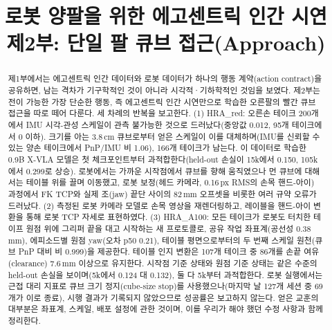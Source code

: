 \documentclass[conference,10pt]{IEEEtran}
\newcommand{\mm}{\,mm\xspace}
\begin{document}
\title{로봇 양팔을 위한 에고센트릭 인간 시연\\제2부: 단일 팔 큐브 접근(Approach)}
\author{
}
\maketitle

\begin{abstract}
제1부에서는 에고센트릭 인간 데이터와 로봇 데이터가 하나의 행동 계약(action contract)을 공유하면, 남는 격차가 기구학적인
것이 아니라 시각적·기하학적인 것임을 보였다. 제2부는 전이 가능한 가장 단순한 행동, 즉 에고센트릭 인간 시연만으로 학습한
오른팔의 빨간 큐브 접근을 따로 떼어 다룬다. 세 차례의 반복을 보고한다. (1) HRA\_red: 오른손 테이크 200개에서 IMU
시각-관성 스케일이 관측 불가능한 것으로 드러났다(중앙값 0.012, 95개 테이크에서 0 이하). 크기를 아는 3.8\,cm 큐브로부터
얻은 스케일이 이를 대체하며(IMU를 신뢰할 수 있는 양손 테이크에서 PnP/IMU 비 1.06), 166개 테이크가 남는다. 이 데이터로
학습한 0.9B X-VLA 모델은 첫 체크포인트부터 과적합한다(held-out 손실이 15k에서 0.150, 105k에서 0.299로 상승). 로봇에서는
가까운 시작점에서 큐브를 향해 움직였으나 먼 큐브에 대해서는 테이블 위를 끌며 이동했고, 로봇 보정(헤드 카메라, 0.16\,px
RMS의 손목 핸드-아이) 과정에서 FK TCP와 실제 조(jaw) 끝단 사이의 82\mm 오프셋을 비롯한 여러 규약 오류가 드러났다.
(2) 측정된 로봇 카메라 모델로 손목 영상을 재렌더링하고, 레이블을 핸드-아이 변환을 통해 로봇 TCP 자세로 표현하였다.
(3) HRA\_A100: 모든 테이크가 로봇도 터치한 테이프 원점 위에 그리퍼 끝을 대고 시작하는 새 프로토콜로, 공유 작업
좌표계(공선성 0.38\mm), 에피소드별 원점 yaw(오차 p50 0.21\textdegree), 테이블 평면으로부터의 두 번째 스케일 원천(큐브
PnP 대비 비 0.999)을 제공한다. 테이블 인지 변환은 107개 테이크 중 86개를 손끝 여유(clearance) 7.6\mm 이상으로 유지한다.
시작점 기준 상태와 원점 기준 상태는 같은 수준의 held-out 손실을 보이며(5k에서 0.124 대 0.132), 둘 다 5k부터 과적합한다.
로봇 실행에서는 근접 대리 지표로 큐브 크기 정지(cube-size stop)를 사용했으나(마지막 날 127개 세션 중 69개가 이로 종료),
시행 결과가 기록되지 않았으므로 성공률은 보고하지 않는다. 얻은 교훈의 대부분은 좌표계, 스케일, 배포 설정에 관한 것이며,
이를 우리가 해야 했던 수정 사항과 함께 정리한다.
\end{abstract}
\end{document}
